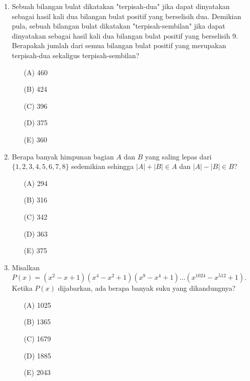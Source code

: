 \documentclass[10pt]{article}
\begin{document}
\begin{enumerate}
    \item Sebuah bilangan bulat dikatakan "terpisah-dua" jika dapat dinyatakan sebagai hasil kali dua bilangan bulat positif yang berselisih dua. Demikian pula, sebuah bilangan bulat dikatakan "terpisah-sembilan" jika dapat dinyatakan sebagai hasil kali dua bilangan bulat positif yang berselisih 9. Berapakah jumlah dari semua bilangan bulat positif yang merupakan terpisah-dua sekaligus terpisah-sembilan?
    \begin{itemize}
        \item[(A)] 460
        \item[(B)] 424
        \item[(C)] 396
        \item[(D)] 375
        \item[(E)] 360
    \end{itemize}

    \item Berapa banyak himpunan bagian $A$ dan $B$ yang saling lepas dari $\{1, 2, 3, 4, 5, 6, 7, 8\}$ sedemikian sehingga $|A|+|B|\in A$ dan $|A|-|B|\in B$?
    \begin{itemize}
        \item[(A)] 294
        \item[(B)] 316
        \item[(C)] 342
        \item[(D)] 363
        \item[(E)] 375
    \end{itemize}

    \item Misalkan $P(x)=(x^{2}-x+1)(x^{4}-x^{2}+1)(x^{8}-x^{4}+1)\dots(x^{1024}-x^{512}+1)$. Ketika $P(x)$ dijabarkan, ada berapa banyak suku yang dikandungnya?
    \begin{itemize}
        \item[(A)] 1025
        \item[(B)] 1365
        \item[(C)] 1679
        \item[(D)] 1885
        \item[(E)] 2043
    \end{itemize}
\end{enumerate}
\end{document}
